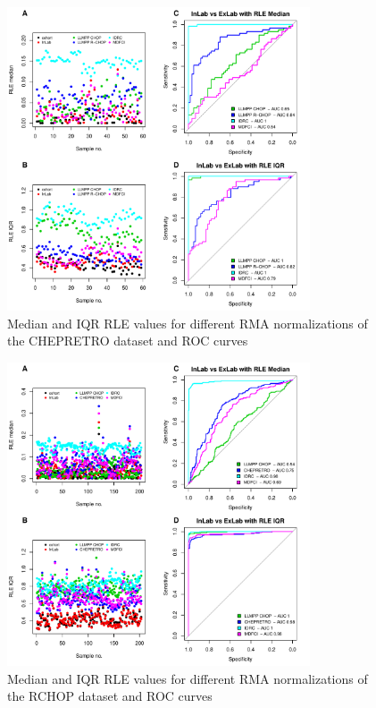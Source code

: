 \documentclass{article}
\begin{document}
\begin{figure}
	\begin{center}
		\includegraphics[width=0.8\textwidth]{figures/chep_rle.pdf}
	\end{center}
	\caption{Median and IQR RLE values for different RMA normalizations of the CHEPRETRO dataset and ROC curves}
	\label{fig:chep_rle}
\end{figure}

\begin{figure}
	\begin{center}
		\includegraphics[width=0.8\textwidth]{figures/RCHOP_rle.pdf}
	\end{center}
	\caption{Median and IQR RLE values for different RMA normalizations of the RCHOP dataset and ROC curves}
	\label{fig:rchop_rle}
\end{figure}
\end{document}
